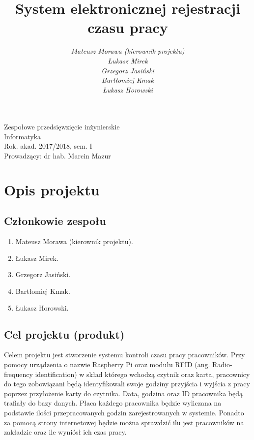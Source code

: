 \documentclass[a4paper]{article}
\title{\bf{System elektronicznej rejestracji \\ czasu pracy}}
\author{{\em Mateusz Morawa (kierownik projektu)}\\
{\em Łukasz Mirek}\\
{\em Grzegorz Jasiński}\\
{\em Bartłomiej Kmak}\\
{\em Łukasz Horowski}\\
}
\date{}
\begin{document}
\begin{titlepage}
\maketitle
\thispagestyle{empty}
\bigskip
\begin{center}
Zespołowe przedsięwzięcie inżynierskie\\[2mm]

Informatyka\\[2mm]

Rok. akad. 2017/2018, sem. I\\[2mm]

Prowadzący: dr hab. Marcin Mazur
\end{center}
\end{titlepage}

\tableofcontents
\thispagestyle{empty}

\newpage

\section{Opis projektu}

\subsection{Członkowie zespołu}

\begin{enumerate}
\item Mateusz Morawa (kierownik projektu).
\item Łukasz Mirek.
\item Grzegorz Jasiński.
\item Bartłomiej Kmak.
\item Łukasz Horowski.
\end{enumerate}

\subsection{Cel projektu (produkt)}

Celem projektu jest stworzenie systemu kontroli czasu pracy pracowników. Przy pomocy urządzenia o nazwie Raspberry Pi oraz modułu RFID (ang. Radio-frequency identification) w skład którego wchodzą czytnik oraz karta, pracownicy do tego zobowiązani będą identyfikowali swoje godziny przyjścia i wyjścia z pracy poprzez przyłożenie karty do czytnika. Data, godzina oraz ID pracownika będą trafiały do bazy danych. Płaca każdego pracownika będzie wyliczana na podstawie ilości przepracowanych godzin zarejestrowanych w systemie. Ponadto za pomocą strony internetowej będzie można sprawdzić ilu jest pracowników na zakładzie oraz ile wyniósł ich czas pracy.
\end{document}
